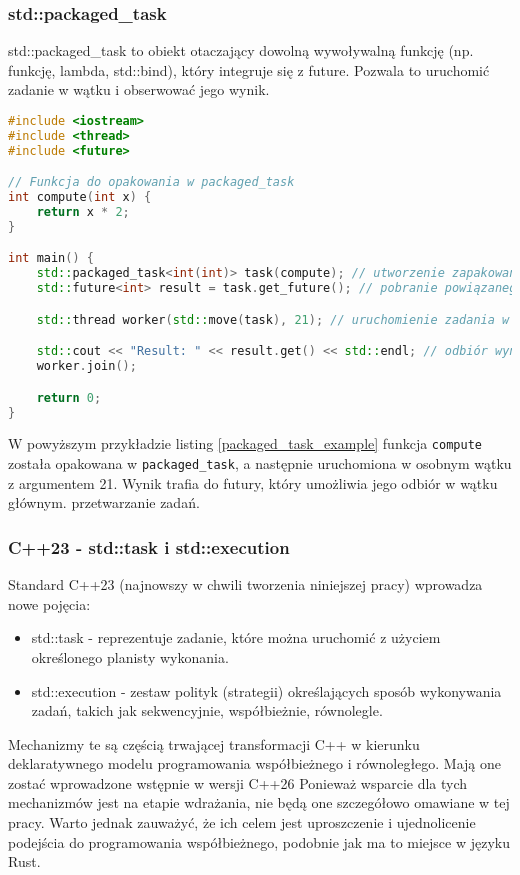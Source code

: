 \subsubsection{std::packaged\_task}
std::packaged\_task to obiekt otaczający dowolną wywoływalną funkcję (np. funkcję, lambda, std::bind), który integruje się z future. Pozwala to uruchomić zadanie w wątku i obserwować jego wynik.
\begin{lstlisting}[language=C++, caption={Przykład użycia std::packaged\_task}, label={packaged_task_example}]
#include <iostream>
#include <thread>
#include <future>

// Funkcja do opakowania w packaged_task
int compute(int x) {
    return x * 2;
}

int main() {
    std::packaged_task<int(int)> task(compute); // utworzenie zapakowanego zadania
    std::future<int> result = task.get_future(); // pobranie powiązanego future

    std::thread worker(std::move(task), 21); // uruchomienie zadania w wątku z parametrem 21

    std::cout << "Result: " << result.get() << std::endl; // odbiór wyniku
    worker.join();

    return 0;
}
\end{lstlisting}
W powyższym przykładzie listing \ref{packaged_task_example} funkcja \texttt{compute} została opakowana w \texttt{packaged\_task}, a następnie uruchomiona w osobnym wątku z argumentem 21. Wynik trafia do futury, który umożliwia jego odbiór w wątku głównym. przetwarzanie zadań.

\subsubsection{C++23 - std::task i std::execution}
Standard C++23 (najnowszy w chwili tworzenia niniejszej pracy) wprowadza nowe pojęcia:
\begin{itemize}
    \item std::task - reprezentuje zadanie, które można uruchomić z użyciem określonego planisty wykonania.
    \item std::execution - zestaw polityk (strategii) określających sposób wykonywania zadań, takich jak sekwencyjnie, współbieżnie, równolegle.
\end{itemize}

Mechanizmy te są częścią trwającej transformacji C++ w kierunku deklaratywnego modelu programowania współbieżnego i równoległego. Mają one zostać wprowadzone wstępnie w wersji C++26 \cite{cpp26} Ponieważ wsparcie dla tych mechanizmów jest na etapie wdrażania, nie będą one szczegółowo omawiane w tej pracy. Warto jednak zauważyć, że ich celem jest uproszczenie i ujednolicenie podejścia do programowania współbieżnego, podobnie jak ma to miejsce w języku Rust.